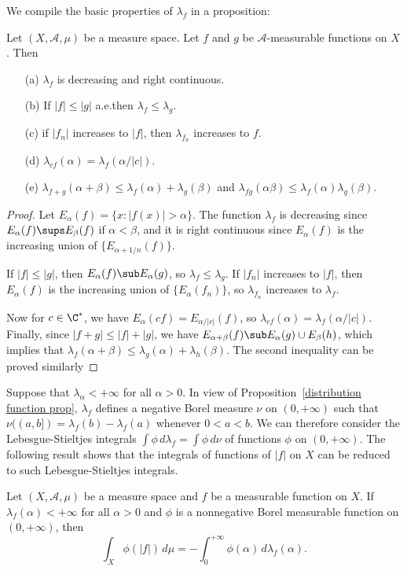 We compile the basic properties of $\lambda_f$ in a proposition:
\begin{proposition}\label{distribution function prop}
Let $(X,\mathcal{A},\mu)$ be a measure space. Let $f$ and $g$ be $\mathcal{A}$-measurable functions on $X$. Then
\begin{itemize}
\item[(a)] $\lambda_f$ is decreasing and right continuous.
\item[(b)] If $|f|\leq|g|$ a.e.then $\lambda_f\leq\lambda_g$.
\item[(c)] if $|f_n|$ increases to $|f|$, then $\lambda_{f_n}$ increases to $f$.
\item[(d)] $\lambda_{cf}(\alpha)=\lambda_f(\alpha/|c|)$.
\item[(e)] $\lambda_{f+g}(\alpha+\beta)\leq\lambda_f(\alpha)+\lambda_g(\beta)$ and $\lambda_{fg}(\alpha\beta)\leq\lambda_f(\alpha)\lambda_g(\beta)$.   
\end{itemize}
\end{proposition}
\begin{proof}
Let $E_\alpha(f)=\{x:|f(x)|>\alpha\}$. The function $\lambda_f$ is decreasing since $E_\alpha(f)\sups E_\beta(f)$ if $\alpha<\beta$, and it is right continuous since $E_\alpha(f)$ is the increasing union of $\{E_{\alpha+1/n}(f)\}$.\par
If $|f|\leq|g|$, then $E_\alpha(f)\sub E_\alpha(g)$, so $\lambda_f\leq\lambda_g$. If $|f_n|$ increases to $|f|$, then $E_\alpha(f)$ is the increasing union of $\{E_\alpha(f_n)\}$, so $\lambda_{f_n}$ increases to $\lambda_f$.\par
Now for $c\in\C^*$, we have $E_\alpha(cf)=E_{\alpha/|c|}(f)$, so $\lambda_{cf}(\alpha)=\lambda_f(\alpha/|c|)$. Finally, since $|f+g|\leq|f|+|g|$, we have $E_{\alpha+\beta}(f)\sub E_\alpha(g)\cup E_\beta(h)$, which implies that $\lambda_f(\alpha+\beta)\leq\lambda_g(\alpha)+\lambda_h(\beta)$. The second inequality can be proved similarly
\end{proof}
Suppose that $\lambda_\alpha<+\infty$ for all $\alpha>0$. In view of Proposition~\ref{distribution function prop}, $\lambda_f$ defines a negative Borel measure $\nu$ on $(0,+\infty)$ such that $\nu((a,b])=\lambda_f(b)-\lambda_f(a)$ whenever $0<a<b$. We can therefore consider the Lebesgue-Stieltjes integrals $\int\phi\,d\lambda_f=\int\phi\,d\nu$ of functions $\phi$ on $(0,+\infty)$. The following result shows that the integrals of functions of $|f|$ on $X$ can be reduced to such Lebesgue-Stieltjes integrals.
\begin{proposition}\label{distribution integral prop}
Let $(X,\mathcal{A},\mu)$ be a measure space and $f$ be a measurable function on $X$. If $\lambda_f(\alpha)<+\infty$ for all $\alpha>0$ and $\phi$ is a nonnegative Borel measurable function on $(0,+\infty)$, then
\[\int_X\phi(|f|)\,d\mu=-\int_{0}^{+\infty}\phi(\alpha)\,d\lambda_f(\alpha).\]
\end{proposition}
